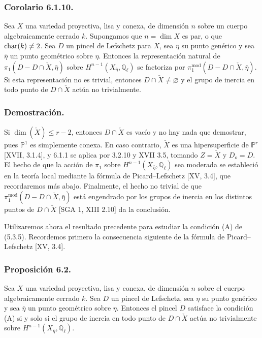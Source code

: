 \pageoriginale

\subsubsection*{Corolario 6.1.10.}

Sea $X$ una variedad proyectiva, lisa y conexa, de dimensión $n$ sobre
un cuerpo algebraicamente cerrado $k$. Supongamos que
$n=\dim X$ es par, o que
$\sisi{\operatorname{card}(k)}{\operatorname{char}(k)}\ne2$. Sea $D$
un pincel de Lefschetz para $X$, sea $\eta$ su punto genérico y sea
$\bar\eta$ un punto geométrico sobre $\eta$. Entonces la representación
natural de $\pi_1(D-D\cap\check X,\bar\eta)$ sobre
$H^{n-1}(X_{\bar\eta},\mathbb Q_\ell)$ se factoriza por
$\pi_1^{\mathrm{mod}}(D-D\cap\check X,\bar\eta)$. Si esta
representación no es trivial, entonces $D\cap\check X\ne\varnothing$ y
el grupo de inercia en todo punto de $D\cap\check X$ actúa no
trivialmente.

\subsubsection*{Demostración.}

Si $\dim(\check X)\le r-2$, entonces $D\cap\check X$ es vacío y no hay
nada que demostrar, pues $\mathbb P^1$ es simplemente conexa. En caso
contrario, $\check X$ es una hipersuperficie de $\mathbb P^r$
[XVII, 3.1.4], y 6.1.1 se aplica por 3.2.10 y XVII 3.5, tomando
$Z=\check X$ y $D_o=D$. El hecho de que la acción de $\pi_1$ sobre
$H^{n-1}(X_{\bar\eta},\mathbb Q_\ell)$ sea moderada se estableció en la
teoría local mediante la fórmula de Picard--Lefschetz [XV, 3.4], que
recordaremos más abajo. Finalmente, el hecho no trivial de que
$\pi_1^{\mathrm{mod}}(D-D\cap\check X,\bar\eta)$ está engendrado por
los grupos de inercia en los distintos puntos de $D\cap\check X$
[SGA 1, XIII 2.10] da la conclusión.

Utilizaremos ahora el resultado precedente para estudiar la condición
(A) de (5.3.5). Recordemos primero la consecuencia siguiente de la
fórmula de Picard--Lefschetz [XV, 3.4].

\pageoriginale

\subsubsection*{Proposición 6.2.}

Sea $X$ una variedad proyectiva, lisa y conexa, de dimensión $n$ sobre
el cuerpo algebraicamente cerrado $k$. Sea $D$ un pincel de Lefschetz,
sea $\eta$ su punto genérico y sea $\bar\eta$ un punto geométrico sobre
$\eta$. Entonces el pincel $D$ satisface la condición (A) si y solo si
el grupo de inercia en todo punto de $D\cap\check X$ actúa no
trivialmente sobre $H^{n-1}(X_{\bar\eta},\mathbb Q_\ell)$.

